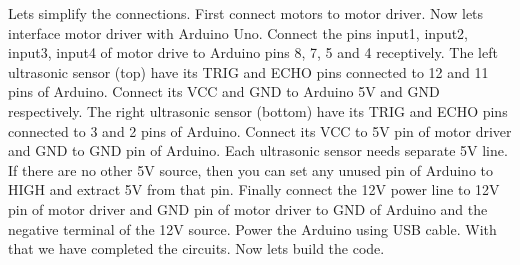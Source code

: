 \par Lets simplify the connections. First connect motors to motor driver. Now lets interface motor driver with Arduino Uno. Connect the pins input1, input2, input3, input4 of motor drive to Arduino pins 8, 7, 5 and 4 receptively. The left ultrasonic sensor (top) have its TRIG and ECHO pins connected to 12 and 11 pins of Arduino. Connect its VCC and GND to Arduino 5V and GND respectively. The right ultrasonic sensor (bottom) have its TRIG and ECHO pins connected to 3 and 2 pins of Arduino. Connect its VCC to 5V pin of motor driver and GND to GND pin of Arduino. Each ultrasonic sensor needs separate 5V line. If there are no other 5V source, then you can set any unused pin of Arduino to HIGH and extract 5V from that pin. Finally connect the 12V power line to 12V pin of motor driver and GND pin of motor driver to GND of Arduino and the negative terminal of the 12V source. Power the Arduino using USB cable. With that we have completed the circuits. Now lets build the code.

